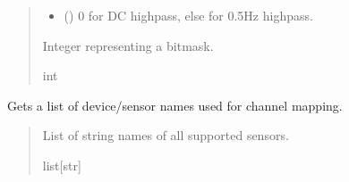 \documentclass[letterpaper,10pt,english]{sphinxmanual}
\begin{document}
\begin{fulllineitems}
\begin{fulllineitems}
\begin{quote}
\begin{description}
\begin{itemize}
\item {} 
\sphinxAtStartPar
{} () \textendash{} 0 for DC highpass, else for 0.5Hz highpass.

\end{itemize}

\sphinxAtStartPar
Integer representing a bitmask.

\sphinxAtStartPar
int

\end{description}\end{quote}

\end{fulllineitems}


\begin{fulllineitems}
\label{\detokenize{Morelia.Devices:Morelia.Devices.PodDevice_8401HR.Pod8401HR.GetSupportedPreampDevices}}
\pysigstartsignatures
{}
\pysigstopsignatures
\sphinxAtStartPar
Gets a list of device/sensor names used for channel mapping.
\begin{quote}\begin{description}
\sphinxAtStartPar
List of string names of all supported sensors.

\sphinxAtStartPar
list{[}str{]}

\end{description}\end{quote}

\end{fulllineitems}



\end{fulllineitems}
\end{document}
